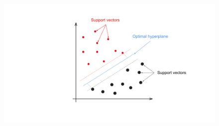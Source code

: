 \\
\begin{figure}[th]
    \centering
    \includegraphics[scale=0.30]{ML/img/hyperplane.png}
\end{figure}

